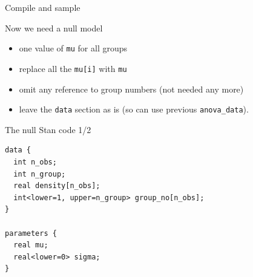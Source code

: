 \documentclass[
  ignorenonframetext,
]{beamer}
\newenvironment{Shaded}{\begin{snugshade}}{\end{snugshade}}
\newcommand{\DataTypeTok}[1]{\textcolor[rgb]{0.13,0.29,0.53}{#1}}
\newcommand{\DecValTok}[1]{\textcolor[rgb]{0.00,0.00,0.81}{#1}}
\newcommand{\KeywordTok}[1]{\textcolor[rgb]{0.13,0.29,0.53}{\textbf{#1}}}
\newcommand{\NormalTok}[1]{#1}
\newcommand{\OperatorTok}[1]{\textcolor[rgb]{0.81,0.36,0.00}{\textbf{#1}}}
\newcommand{\StringTok}[1]{\textcolor[rgb]{0.31,0.60,0.02}{#1}}
\providecommand{\tightlist}{%
  \setlength{\itemsep}{0pt}\setlength{\parskip}{0pt}}
\begin{document}
\begin{frame}[fragile]{Compile and sample}
\protect\hypertarget{compile-and-sample}{}

\begin{Shaded}
\end{Shaded}

\end{frame}

\begin{frame}[fragile]{Now we need a null model}
\protect\hypertarget{now-we-need-a-null-model}{}

\begin{itemize}
\tightlist
\item
  one value of \texttt{mu} for all groups
\item
  replace all the \texttt{mu{[}i{]}} with \texttt{mu}
\item
  omit any reference to group numbers (not needed any more)
\item
  leave the \texttt{data} section as is (so can use previous
  \texttt{anova\_data}).
\end{itemize}

\end{frame}

\begin{frame}[fragile]{The null Stan code 1/2}
\protect\hypertarget{the-null-stan-code-12}{}

\begin{verbatim}
data {
  int n_obs;
  int n_group;
  real density[n_obs];
  int<lower=1, upper=n_group> group_no[n_obs];
}

parameters {
  real mu;
  real<lower=0> sigma;
}
\end{verbatim}

\end{frame}
\end{document}
